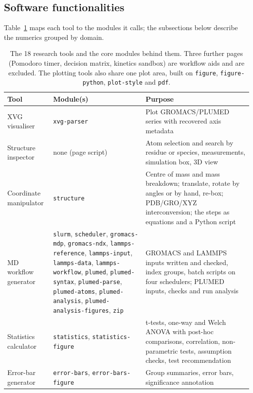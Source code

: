 \documentclass[11pt,a4paper]{article}
\begin{document}
\subsection{Software functionalities}
\label{sec:functionalities}

Table~\ref{tab:tools} maps each tool to the modules it calls; the subsections
below describe the numerics grouped by domain.

\begin{table}[htbp]
\centering
\caption{The 18 research tools and the core modules behind them. Three further
pages (Pomodoro timer, decision matrix, kinetics sandbox) are workflow aids and
are excluded. The plotting tools also share one plot area, built on
\texttt{figure}, \texttt{figure-python}, \texttt{plot-style} and \texttt{pdf}.}
\label{tab:tools}
\scriptsize
\begin{tabular}{@{}>{\raggedright\arraybackslash}p{2.8cm}>{\raggedright\arraybackslash}p{4.1cm}>{\raggedright\arraybackslash}p{5.9cm}@{}}
\toprule
\textbf{Tool} & \textbf{Module(s)} & \textbf{Purpose} \\
\midrule
XVG visualiser & \texttt{xvg-parser} & Plot GROMACS/PLUMED series with recovered axis metadata \\
Structure inspector & none (page script) & Atom selection and search by residue or species, measurements, simulation box, 3D view \\
Coordinate manipulator & \texttt{structure} & Centre of mass and mass breakdown; translate, rotate by angles or by hand, re-box; PDB/GRO/XYZ interconversion; the steps as equations and a Python script \\
MD workflow generator & \texttt{slurm}, \texttt{scheduler}, \texttt{gromacs-mdp}, \texttt{gromacs-ndx}, \texttt{lammps-reference}, \texttt{lammps-input}, \texttt{lammps-data}, \texttt{lammps-workflow}, \texttt{plumed}, \texttt{plumed-syntax}, \texttt{plumed-parse}, \texttt{plumed-atoms}, \texttt{plumed-analysis}, \texttt{plumed-analysis-figures}, \texttt{zip} & GROMACS and LAMMPS inputs written and checked, index groups, batch scripts on four schedulers; PLUMED inputs, checks and run analysis \\
Statistics calculator & \texttt{statistics}, \texttt{statistics-figure} & t-tests, one-way and Welch ANOVA with post-hoc comparisons, correlation, non-parametric tests, assumption checks, test recommendation \\
Error-bar generator & \texttt{error-bars}, \texttt{error-bars-figure} & Group summaries, error bars, significance annotation \\

\end{tabular}
\end{table}
\end{document}
